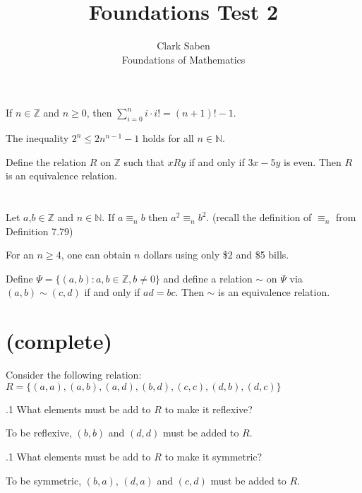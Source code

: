 \documentclass[12pt]{article}
\newenvironment{theorem}[2][Theorem]{\begin{trivlist}
\item[\hskip \labelsep {\bfseries #1}\hskip \labelsep {\bfseries #2.}]}{\end{trivlist}}
\newenvironment{problem}[2][Problem]{\begin{trivlist}
\item[\hskip \labelsep {\bfseries #1}\hskip \labelsep {\bfseries #2.}]}{\end{trivlist}}
\begin{document}
 
 
\title{Foundations Test 2}%
\author{Clark Saben\\ %
Foundations of Mathematics} %
 
\maketitle

\section{}
\begin{theorem}1
	If $n \in \mathbb{Z}$ and $n \geq 0$, then $\sum_{i=0}^{n}i\cdot i! = \left(n+1 \right)!-1$.
\end{theorem}
\begin{theorem}2
	The inequality $2^n \leq 2n^{n-1}-1$ holds for all $n \in \mathbb{N}$.
\end{theorem}
\begin{theorem}3
	Define the relation $R$ on $\mathbb{Z}$ such that $xRy$ if and only if $3x-5y$ is even. Then $R$ is an equivalence relation.
\end{theorem}
\section{}
\begin{theorem}4
	Let $a$,$b \in \mathbb{Z}$ and $n \in \mathbb{N}$. If $a \equiv_n b$ then $a^2 \equiv_n b^2$. (recall the definition of $\equiv_n$ from Definition 7.79)
\end{theorem}
\begin{theorem}5
	For an $n \geq 4$, one can obtain $n$ dollars using only \$2 and \$5 bills.
\end{theorem}
\begin{theorem}6
	Define $\Psi = \{(a,b): a,b \in \mathbb{Z}, b\neq 0\}$ and define a relation $\sim$ on $\Psi$ via $(a,b) \sim (c,d)$ if and only if
	$ad=bc$. Then $\sim$ is an equivalence relation.
\end{theorem}
\section{(complete)}
\begin{problem}1
	Consider the following relation:\\
	$R = \{(a,a),(a,b),(a,d),(b,d),(c,c),(d,b),(d,c)\}$
\end{problem}
\begin{problem}1.1
 What elements must be add to $R$ to make it reflexive?
\end{problem}
To be reflexive, $(b,b)$ and $(d,d)$ must be added to $R$.
\begin{problem}1.1
 What elements must be add to $R$ to make it symmetric?
\end{problem}
To be symmetric, $(b,a)$, $(d,a)$ and $(c,d)$ must be added to $R$.



 
\end{document}
